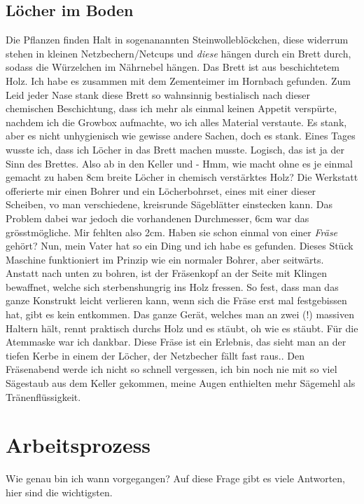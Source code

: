 \documentclass[12pt,titlepage,a4paper]{article}
\begin{document}
\subsection{Löcher im Boden}
Die Pflanzen finden Halt in sogenanannten Steinwolleblöckchen, diese widerrum stehen in kleinen Netzbechern/Netcups und \textit{diese} hängen durch ein Brett durch, sodass die Würzelchen im Nährnebel hängen. Das Brett ist aus beschichtetem Holz. Ich habe es zusammen mit dem Zementeimer im Hornbach gefunden. Zum Leid jeder Nase stank diese Brett so wahnsinnig bestialisch nach dieser chemischen Beschichtung, dass ich mehr als einmal keinen Appetit verspürte, nachdem ich die Growbox aufmachte, wo ich alles Material verstaute. Es stank, aber es nicht unhygienisch wie gewisse andere Sachen, doch es stank. Eines Tages wusste ich, dass ich Löcher in das Brett machen musste. Logisch, das ist ja der Sinn des Brettes. Also ab in den Keller und - Hmm, wie macht ohne es je einmal gemacht zu haben 8cm breite Löcher in chemisch verstärktes Holz? Die Werkstatt offerierte mir einen Bohrer und ein Löcherbohrset, eines mit einer dieser Scheiben, vo man verschiedene, kreisrunde Sägeblätter einstecken kann. Das Problem dabei war jedoch die vorhandenen Durchmesser, 6cm war das grösstmögliche. Mir fehlten also 2cm. Haben sie schon einmal von einer \textit{Fräse} gehört? Nun, mein Vater hat so ein Ding und ich habe es gefunden. Dieses Stück Maschine funktioniert im Prinzip wie ein normaler Bohrer, aber seitwärts. Anstatt nach unten zu bohren, ist der Fräsenkopf an der Seite mit Klingen bewaffnet, welche sich sterbenshungrig ins Holz fressen. So fest, dass man das ganze Konstrukt leicht verlieren kann, wenn sich die Fräse erst mal festgebissen hat, gibt es kein entkommen. Das ganze Gerät, welches man an zwei (!) massiven Haltern hält, rennt praktisch durchs Holz und es stäubt, oh wie es stäubt. Für die Atemmaske war ich dankbar. Diese Fräse ist ein Erlebnis, das sieht man an der tiefen Kerbe in einem der Löcher, der Netzbecher fällt fast raus.. Den Fräsenabend werde ich nicht so schnell vergessen, ich bin noch nie mit so viel Sägestaub aus dem Keller gekommen, meine Augen enthielten mehr Sägemehl als Tränenflüssigkeit.


\section{Arbeitsprozess}
Wie genau bin ich wann vorgegangen? Auf diese Frage gibt es viele Antworten, hier sind die wichtigsten.
\end{document}
